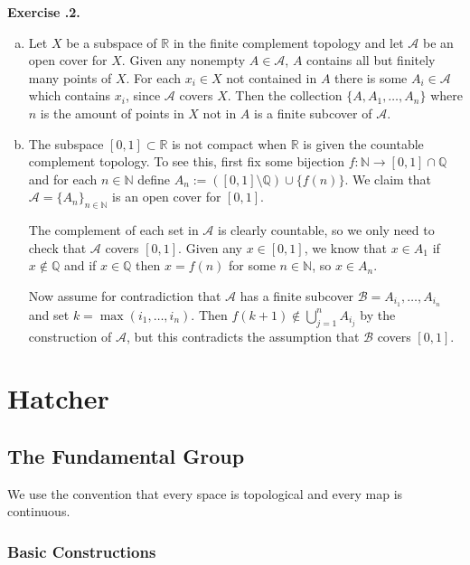 \documentclass{report}
\theoremstyle{definition}
\theoremstyle{remark}
\newenvironment{exc}[1]{\noindent\textbf{Exercise \thesection.#1.}}{\medskip}
\newcommand{\N}{\mathbb{N}}
\newcommand{\Q}{\mathbb{Q}}
\newcommand{\R}{\mathbb{R}}
\newcommand{\set}[1]{\{#1\}}
\newcommand{\prt}[1]{\mathcal{#1}}
\let\oldmax\max
\renewcommand{\max}[1]{\oldmax \left( #1 \right)}
\begin{document}
\begin{exc}{2}
    \begin{enumerate}[(a)]
        \item Let $X$ be a subspace of $\R$ in the finite complement topology and let $\prt{A}$ be an open cover for $X$. Given any nonempty $A \in \prt{A}$, $A$ contains all but finitely many points of $X$. For each $x_i \in X$ not contained in $A$ there is some $A_i \in \prt{A}$ which contains $x_i$, since $\prt{A}$ covers $X$. Then the collection $\set{A, A_1, \dots, A_n}$ where $n$ is the amount of points in $X$ not in $A$ is a finite subcover of $\prt{A}$.
        
        \item The subspace $[0, 1] \subset \R$ is not compact when $\R$ is given the countable complement topology. To see this, first fix some bijection $f : \N \to [0, 1] \cap \Q$ and for each $n \in \N$ define $A_n := ([0, 1] \setminus{\Q}) \cup \set{f(n)}$. We claim that $\prt{A} = \set{A_n}_{n \in \N}$ is an open cover for $[0, 1]$.
        
        The complement of each set in $\prt{A}$ is clearly countable, so we only need to check that $\prt{A}$ covers $[0, 1]$. Given any $x \in [0, 1]$, we know that $x \in A_1$ if $x \notin \Q$ and if $x \in \Q$ then $x = f(n)$ for some $n \in \N$, so $x \in A_n$.
        
        Now assume for contradiction that $\prt{A}$ has a finite subcover $\prt{B} = {A_{i_1}, \dots, A_{i_n}}$ and set $k = \max{i_1, \dots, i_n}$. Then $f(k+1) \notin \bigcup_{j=1}^n A_{i_j}$ by the construction of $\prt{A}$, but this contradicts the assumption that $\prt{B}$ covers $[0, 1]$. 
        
    \end{enumerate}
\end{exc}

\part{Hatcher}

\chapter{The Fundamental Group}

We use the convention that every space is topological and every map is continuous.

\section{Basic Constructions}
\end{document}
